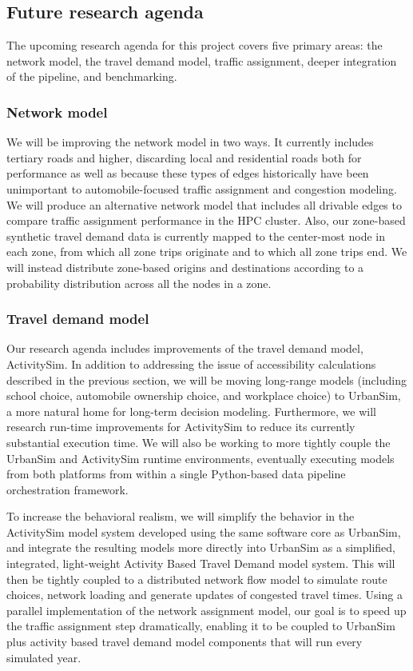 \subsection{Future research agenda}

The upcoming research agenda for this project covers five primary areas: the network model, the travel demand model, traffic assignment, deeper integration of the pipeline, and benchmarking.

\subsubsection{Network model}

We will be improving the network model in two ways. It currently includes tertiary roads and higher, discarding local and residential roads both for performance as well as because these types of edges historically have been unimportant to automobile-focused traffic assignment and congestion modeling. We will produce an alternative network model that includes all drivable edges to compare traffic assignment performance in the HPC cluster. Also, our zone-based synthetic travel demand data is currently mapped to the center-most node in each zone, from which all zone trips originate and to which all zone trips end. We will instead distribute zone-based origins and destinations according to a probability distribution across all the nodes in a zone.

\subsubsection{Travel demand model}

Our research agenda includes improvements of the travel demand model, ActivitySim. In addition to addressing the issue of accessibility calculations described in the previous section, we will be moving long-range models (including school choice, automobile ownership choice, and workplace choice) to UrbanSim, a more natural home for long-term decision modeling. Furthermore, we will research run-time improvements for ActivitySim to reduce its currently substantial execution time. We will also be working to more tightly couple the UrbanSim and ActivitySim runtime environments, eventually executing models from both platforms from within a single Python-based data pipeline orchestration framework. 

To increase the behavioral realism, we will simplify the behavior in the ActivitySim model system developed using the same software core as UrbanSim, and integrate the resulting models more directly into UrbanSim as a simplified, integrated, light-weight Activity Based Travel Demand model system. This will then be tightly coupled to a distributed network flow model to simulate route choices, network loading and generate updates of congested travel times. Using a parallel implementation of the network assignment model, our goal is to speed up the traffic assignment step dramatically, enabling it to be coupled to UrbanSim plus activity based travel demand model components that will run every simulated year.

